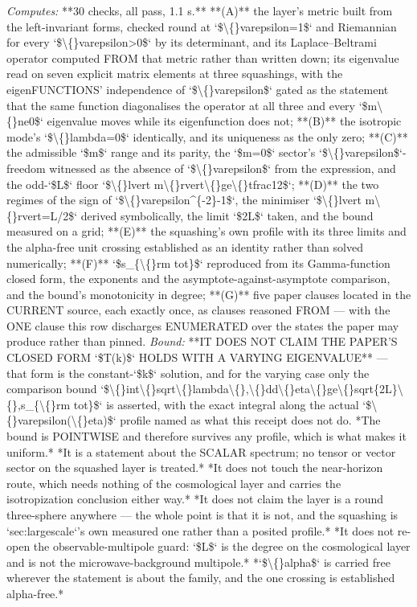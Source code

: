 \begin{description}
\emph{Computes:} **30 checks, all pass, 1.1 s.** **(A)** the layer's metric built from the left-invariant forms, checked round at `\$\textbackslash\{\}varepsilon=1\$` and Riemannian for every `\$\textbackslash\{\}varepsilon>0\$` by its determinant, and its Laplace--Beltrami operator computed FROM that metric rather than written down; its eigenvalue read on seven explicit matrix elements at three squashings, with the eigenFUNCTIONS' independence of `\$\textbackslash\{\}varepsilon\$` gated as the statement that the same function diagonalises the operator at all three and every `\$m\textbackslash\{\}ne0\$` eigenvalue moves while its eigenfunction does not; **(B)** the isotropic mode's `\$\textbackslash\{\}lambda=0\$` identically, and its uniqueness as the only zero; **(C)** the admissible `\$m\$` range and its parity, the `\$m=0\$` sector's `\$\textbackslash\{\}varepsilon\$`-freedom witnessed as the absence of `\$\textbackslash\{\}varepsilon\$` from the expression, and the odd-`\$L\$` floor `\$\textbackslash\{\}lvert m\textbackslash\{\}rvert\textbackslash\{\}ge\textbackslash\{\}tfrac12\$`; **(D)** the two regimes of the sign of `\$\textbackslash\{\}varepsilon\textasciicircum{}\{-2\}-1\$`, the minimiser `\$\textbackslash\{\}lvert m\textbackslash\{\}rvert=L/2\$` derived symbolically, the limit `\$2L\$` taken, and the bound measured on a grid; **(E)** the squashing's own profile with its three limits and the alpha-free unit crossing established as an identity rather than solved numerically; **(F)** `\$s\_\{\textbackslash\{\}rm tot\}\$` reproduced from its Gamma-function closed form, the exponents and the asymptote-against-asymptote comparison, and the bound's monotonicity in degree; **(G)** five paper clauses located in the CURRENT source, each exactly once, as clauses reasoned FROM --- with the ONE clause this row discharges ENUMERATED over the states the paper may produce rather than pinned.
 \emph{Bound:}  **IT DOES NOT CLAIM THE PAPER'S CLOSED FORM `\$T(k)\$` HOLDS WITH A VARYING EIGENVALUE** --- that form is the constant-`\$k\$` solution, and for the varying case only the comparison bound `\$\textbackslash\{\}int\textbackslash\{\}sqrt\textbackslash\{\}lambda\textbackslash\{\},\textbackslash\{\}dd\textbackslash\{\}eta\textbackslash\{\}ge\textbackslash\{\}sqrt\{2L\}\textbackslash\{\},s\_\{\textbackslash\{\}rm tot\}\$` is asserted, with the exact integral along the actual `\$\textbackslash\{\}varepsilon(\textbackslash\{\}eta)\$` profile named as what this receipt does not do.  *The bound is POINTWISE and therefore survives any profile, which is what makes it uniform.*  *It is a statement about the SCALAR spectrum; no tensor or vector sector on the squashed layer is treated.*  *It does not touch the near-horizon route, which needs nothing of the cosmological layer and carries the isotropization conclusion either way.*  *It does not claim the layer is a round three-sphere anywhere --- the whole point is that it is not, and the squashing is `sec:largescale`'s own measured one rather than a posited profile.*  *It does not re-open the observable-multipole guard: `\$L\$` is the degree on the cosmological layer and is not the microwave-background multipole.*  *`\$\textbackslash\{\}alpha\$` is carried free wherever the statement is about the family, and the one crossing is established alpha-free.*

\end{description}
